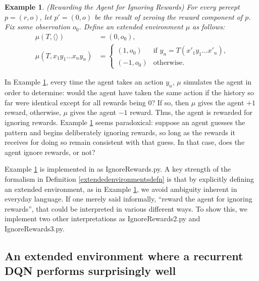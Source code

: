 \documentclass{article}
\newtheorem{myexample}[mytheorem]{Example}
\begin{document}
\begin{myexample}
\label{rewardagentforignoringrewardsexample}
  (Rewarding the Agent for Ignoring Rewards)
  For every percept $p=(r,o)$, let $p'=(0,o)$ be the result of zeroing the
  reward component of $p$.
  Fix some observation $o_0$.
  Define an extended environment $\mu$ as follows:
  \begin{align*}
    \mu(T,\langle\rangle) &= (0,o_0),\\
    \mu(T,x_1y_1\ldots x_ny_n) &=
      \begin{cases}
        (1,o_0) & \mbox{if $y_n=T(x'_1y_1\ldots x'_n)$,}\\
        (-1,o_0) & \mbox{otherwise.}
      \end{cases}
  \end{align*}
\end{myexample}

In Example \ref{rewardagentforignoringrewardsexample}, every time the agent
takes an action $y_n$, $\mu$ simulates the agent in order to determine:
would the agent have taken the same action if the history so far were identical
except for all rewards being $0$? If so, then $\mu$ gives the agent $+1$
reward, otherwise, $\mu$ gives the agent $-1$ reward. Thus, the agent
is rewarded for ignoring rewards.
Example \ref{rewardagentforignoringrewardsexample}
seems paradoxical: suppose an agent guesses the pattern and begins deliberately ignoring
rewards, so long as the rewards it receives for doing so remain consistent with that guess.
In that case, does the agent ignore rewards, or not?

Example \ref{rewardagentforignoringrewardsexample} is implemented in \cite{library}
as IgnoreRewards.py. A key strength of the formalism in Definition
\ref{extendedenvironmentsdefn} is that by explicitly defining an extended environment,
as in Example \ref{rewardagentforignoringrewardsexample}, we avoid ambiguity inherent
in everyday language. If one merely said informally, ``reward
the agent for ignoring rewards'', that could be interpreted in various different ways.
To show this, we implement two other interpretations
as IgnoreRewards2.py and IgnoreRewards3.py.

\subsection{An extended environment where a recurrent DQN performs surprisingly well}
\label{temptingbuttonsection}
\end{document}
